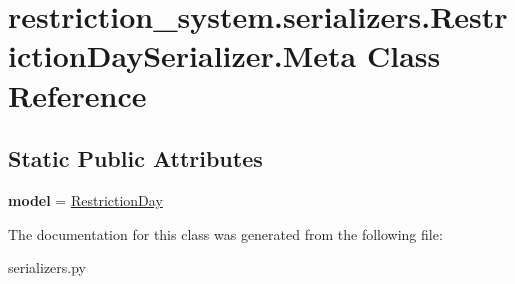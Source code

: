 \hypertarget{classrestriction__system_1_1serializers_1_1RestrictionDaySerializer_1_1Meta}{}\section{restriction\+\_\+system.\+serializers.\+Restriction\+Day\+Serializer.\+Meta Class Reference}
\label{classrestriction__system_1_1serializers_1_1RestrictionDaySerializer_1_1Meta}
\subsection*{Static Public Attributes}
\begin{DoxyCompactItemize}
\item 
\hypertarget{classrestriction__system_1_1serializers_1_1RestrictionDaySerializer_1_1Meta_a1fe4d7fff04146bab60353a8d7ec17fc}{}{\bfseries model} = \hyperlink{classrestriction__system_1_1models_1_1RestrictionDay}{Restriction\+Day}\label{classrestriction__system_1_1serializers_1_1RestrictionDaySerializer_1_1Meta_a1fe4d7fff04146bab60353a8d7ec17fc}

\end{DoxyCompactItemize}


The documentation for this class was generated from the following file\+:\begin{DoxyCompactItemize}
\item 
serializers.\+py\end{DoxyCompactItemize}
